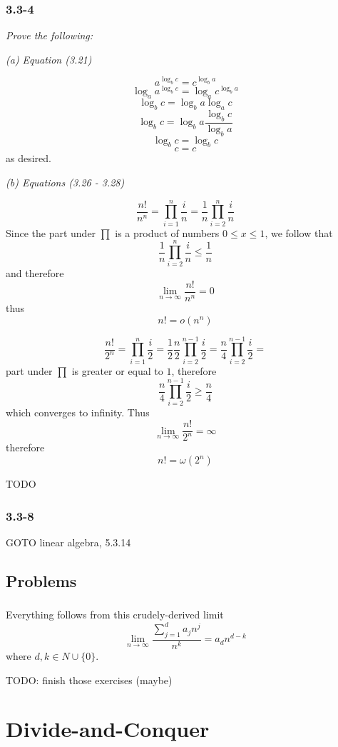 \documentclass[11pt,oneside,titlepage]{book}
\begin{document}
\subsection*{3.3-4}

\textit{Prove the following: }

\textit{(a) Equation (3.21)}

$$a^{\log_b{c}} = c^{\log_b{a}}$$
$$\log_a{a^{\log_b{c}}} = \log_a{c^{\log_b{a}}}$$
$$\log_b{c} = \log_b{a} \log_a{c}$$
$$\log_b{c} = \log_b{a} \frac{\log_b{c}}{\log_b{a}}$$
$$\log_b{c} = \log_b{c}$$
$$c = c$$
as desired.

\textit{(b) Equations (3.26 - 3.28)}


$$\frac{n!}{n^n} = \prod_{i = 1}^n{\frac{i}{n}} = \frac{1}{n} \prod_{i = 2}^n{\frac{i}{n}}$$
Since the part under $\prod$ is a product of numbers $0 \leq x \leq 1$, we follow that
$$\frac{1}{n} \prod_{i = 2}^n{\frac{i}{n}} \leq \frac{1}{n}$$
and therefore 
$$\lim_{n \to \infty}{\frac{n!}{n^n}} = 0$$
thus
$$n! = o(n^n)$$

$$\frac{n!}{2^n} = \prod_{i = 1}^{n}{\frac{i}{2}} =
\frac{1}{2} \frac{n}{2} \prod_{i = 2}^{n - 1}{\frac{i}{2}} =
\frac{n}{4} \prod_{i = 2}^{n - 1}{\frac{i}{2}} = 
$$
part under $\prod$ is greater or equal to $1$, therefore
$$\frac{n}{4} \prod_{i = 2}^{n - 1}{\frac{i}{2}} \geq \frac{n}{4}$$
which converges to infinity. Thus
$$\lim_{n \to \infty}{\frac{n!}{2^n}} = \infty$$
therefore
$$n! = \omega(2^n)$$

TODO


\subsection*{3.3-8}

GOTO linear algebra, 5.3.14

\section{Problems}

\subsection{}

Everything follows from this crudely-derived limit
$$\lim_{n \to \infty}{\frac{\sum_{j = 1}^d {a_j n^j}}{n^k}} = a_d n^{d - k} $$
where $d, k \in N \cup \{0\}$.

TODO: finish those exercises (maybe)


\chapter{Divide-and-Conquer}
\end{document}
